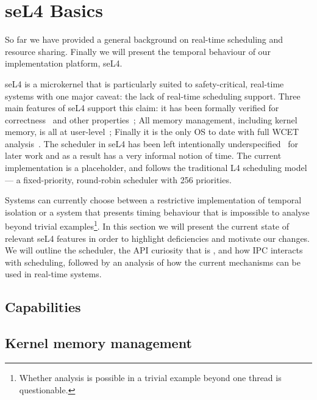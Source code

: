 

\chapter{seL4 Basics}


So far we have provided a general background on real-time scheduling and resource sharing.
Finally we will present the temporal behaviour of our implementation platform, seL4.

seL4 is a microkernel that is particularly suited to safety-critical, real-time systems with one major caveat: the lack of real-time scheduling support. 
Three main features of seL4 support this claim: it has been formally verified for correctness~\citep{Klein_EHACDEEKNSTW_09} and other properties~\citep{Sewell_WGMAK_11}; All memory management, including kernel memory, is all at user-level~\citep{Elkaduwe_Derrin_06}; Finally it is the only \gls{OS} to date with full \gls{WCET} analysis~\citep{Blackham_SCRH_11}.
The scheduler in seL4 has been left intentionally underspecified~\citep{Petters_EH_12} for later work and as a result has a very informal notion of time.
The current implementation is a placeholder, and follows the traditional L4 scheduling model~\citep{Ruocco_06} --- a fixed-priority, round-robin scheduler with 256 priorities.

Systems can currently choose between a restrictive implementation of temporal isolation or a system that presents timing behaviour that is impossible to analyse beyond trivial examples\footnote{Whether analysis is possible in a trivial example beyond one thread is questionable.}.
In this section we will present the current state of relevant seL4 features in order to highlight deficiencies and motivate our changes.
We will outline the scheduler, the API curiosity that is \yield, and how \gls{IPC} interacts with scheduling, followed by an analysis of how the current mechanisms can be used in real-time systems.

\section{Capabilities}

\section{Kernel memory management}

